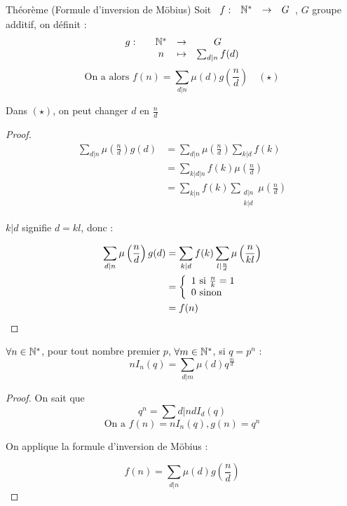 \documentclass[]{report}
\begin{document}
    \begin{tm}{Théorème (Formule d'inversion de Möbius)}{}
        Soit $\begin{array}{ccccc} f : & \mathbb{N}^* & \to & G \end{array}$, $G$ groupe additif, on définit :
        \[\begin{array}{ccccc} g : & & \mathbb{N}^* & \to & G \\ & & n & \mapsto & \sum_{d|n}f(d) \end{array}\]
        \[\text{On a alors }f(n)=\sum_{d|n}\mu(d) g\left(\frac{n}{d}\right)\quad (\star)\]
    \end{tm}

    \begin{re}{}{}
        Dans $(\star)$, on peut changer $d$ en $\frac{n}{d}$
    \end{re}

    \begin{proof}
        \begin{align*}
            \sum_{d|n}\mu\left(\frac{n}{d}\right)g(d)&=\sum_{d|n}\mu\left(\frac{n}{d}\right)\sum_{k|d}f(k)\\
            &=\sum_{k|d|n}f(k)\mu\left(\frac{n}{d}\right)\\
            &=\sum_{k|n}f(k)\underset{\substack{d|n\\k|d}}{\sum}\mu\left(\frac{n}{d}\right)
        \end{align*}
        \begin{center}
            $k|d$ signifie $d=kl$, donc :
        \end{center}
        \begin{align*}
            \sum_{d|n}\mu\left(\frac{n}{d}\right)g(d)&=\sum_{k|d}f(k)\sum_{l|\frac{n}{d}}\mu\left(\frac{n}{kl}\right)\\
            &=\left\{\begin{array}{ll} 1\text{ si }\frac{n}{k}=1\\
            0\text{ sinon} \end{array} \right.\\
            &=f(n)
        \end{align*}
    \end{proof}

    \begin{cor}{}{}
        $\forall n\in\mathbb{N}^*$, pour tout nombre premier $p$, $\forall m\in\mathbb{N}^*$, si $q=p^n$ :
        \[nI_n(q)=\sum_{d|m}\mu(d)q^{\frac{m}{d}}\]
    \end{cor}

    \begin{proof}
        On sait que
        \[q^n=\sum{d|n}d I_d(q)\]
        \[\text{On a }f(n)=nI_n(q),g(n)=q^n\]
        \begin{center}
            On applique la formule d'inversion de Möbius :
        \end{center}
        \[f(n)=\sum_{d|n}\mu(d)g\left(\frac{n}{d}\right)\]
    \end{proof}
\end{document}
